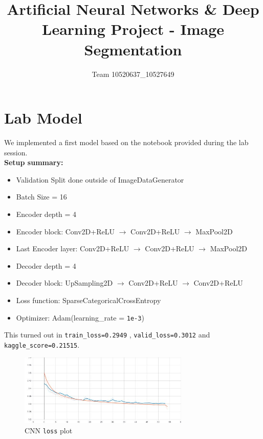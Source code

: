 \documentclass{article}
\title{Artificial Neural Networks \& Deep Learning
Project - Image Segmentation}
\author{Team 10520637\_10527649}
\begin{document}
	\maketitle

	\section{Lab Model}
		We implemented a first model based on the notebook provided during the lab session. \\
		\textbf{Setup summary:}
		
		\begin{itemize}
			
			\item Validation Split done outside of ImageDataGenerator
			
			\item Batch Size = 16
			
			\item Encoder depth = 4
			
			\item Encoder block: Conv2D+ReLU $\rightarrow$ Conv2D+ReLU $\rightarrow$ MaxPool2D
			
			\item Last Encoder layer: Conv2D+ReLU $\rightarrow$ Conv2D+ReLU $\rightarrow$ MaxPool2D
			
			\item Decoder depth = 4
			
			\item Decoder block: UpSampling2D $\rightarrow$ Conv2D+ReLU $\rightarrow$ Conv2D+ReLU
			
			\item Loss function: SparseCategoricalCrossEntropy
			
			\item Optimizer: Adam(learning\_rate = \texttt{1e-3})
		\end{itemize}				 
 

    	This turned out in \texttt{train\_loss=0.2949} , \texttt{valid\_loss=0.3012} and \texttt{kaggle\_score=0.21515}. 
    	
    	\begin{figure}[H]
			\centering
			\includegraphics[height=3.4cm, keepaspectratio]{First_Model_CNN_Dec04_19-24-31_epoch_loss.jpg}
			\caption{CNN \texttt{loss} plot}
		\end{figure}
	
\end{document}
